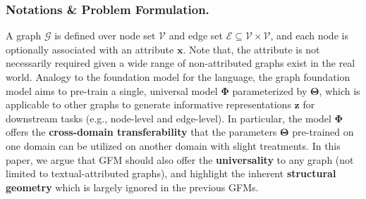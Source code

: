 
\vspace{-0.05in}
\subsubsection*{\textbf{Notations \& Problem Formulation.}}
A graph $\mathcal G$ is defined over node set $\mathcal V$ and edge set $\mathcal E \subseteq \mathcal V \times \mathcal V$, 
and each node is optionally associated with an attribute $\boldsymbol x$.
Note that, the attribute is not necessarily required given a wide range of non-attributed graphs exist in the real world.
Analogy to the foundation model for the language, the graph foundation model aims to pre-train a single, universal model $\mathbf \Phi$ parameterized by $\mathbf \Theta$, which is applicable to other graphs to generate informative representations $\boldsymbol z$ for downstream tasks (e.g., node-level and edge-level).
In particular, the model $\mathbf \Phi$ offers the \textbf{cross-domain transferability} that the parameters $\mathbf \Theta$ pre-trained on one domain can be utilized on another domain with slight treatments.
In this paper, we argue that GFM should also offer the \textbf{universality} to any graph (not limited to textual-attributed graphs), and highlight the inherent \textbf{structural geometry} which is largely ignored in the previous GFMs.




